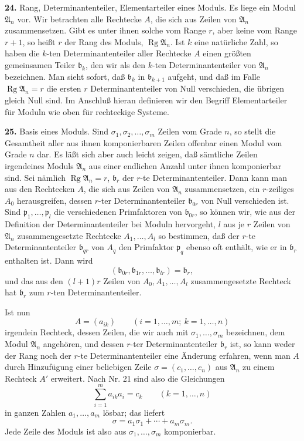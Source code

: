 \documentclass[11pt,a4paper]{article}
\begin{document}
\textbf{24.} Rang, Determinantenteiler, Elementarteiler eines Moduls. Es liege ein Modul \(\mathfrak A_n\) vor. Wir betrachten alle Rechtecke \(A\), die sich aus Zeilen von \(\mathfrak A_n\) zusammensetzen. Gibt es unter ihnen solche vom Range \(r\), aber keine vom Range \(r+1\), so heißt \(r\) der Rang des Moduls, \(\operatorname{Rg}\mathfrak A_n\). Ist \(k\) eine natürliche Zahl, so haben die \(k\)-ten Determinantenteiler aller Rechtecke \(A\) einen größten gemeinsamen Teiler \(\mathfrak b_k\), den wir als den \(k\)-ten Determinantenteiler von \(\mathfrak A_n\) bezeichnen. Man sieht sofort, daß \(\mathfrak b_k\) in \(\mathfrak b_{k+1}\) aufgeht, und daß im Falle \(\operatorname{Rg}\mathfrak A_n=r\) die ersten \(r\) Determinantenteiler von Null verschieden, die übrigen gleich Null sind. Im Anschluß hieran definieren wir den Begriff Elementarteiler für Moduln wie oben für rechteckige Systeme.

\textbf{25.} Basis eines Moduls. Sind \(\sigma_1,\sigma_2,\ldots,\sigma_m\) Zeilen vom Grade \(n\), so stellt die Gesamtheit aller aus ihnen komponierbaren Zeilen offenbar einen Modul vom Grade \(n\) dar. Es läßt sich aber auch leicht zeigen, daß sämtliche Zeilen irgendeines Moduls \(\mathfrak A_n\) aus einer endlichen Anzahl unter ihnen komponierbar sind. Sei nämlich \(\operatorname{Rg}\mathfrak A_n=r\), \(\mathfrak b_r\) der \(r\)-te Determinantenteiler. Dann kann man aus den Rechtecken \(A\), die sich aus Zeilen von \(\mathfrak A_n\) zusammensetzen, ein \(r\)-zeiliges \(A_0\) herausgreifen, dessen \(r\)-ter Determinantenteiler \(\mathfrak b_{0r}\) von Null verschieden ist. Sind \(\mathfrak p_1,\ldots,\mathfrak p_l\) die verschiedenen Primfaktoren von \(\mathfrak b_{0r}\), so können wir, wie aus der Definition der Determinantenteiler bei Moduln hervorgeht, \(l\) aus je \(r\) Zeilen von \(\mathfrak A_n\) zusammengesetzte Rechtecke \(A_1,\ldots,A_l\) so bestimmen, daß der \(r\)-te Determinantenteiler \(\mathfrak b_{qr}\) von \(A_q\) den Primfaktor \(\mathfrak p_q\) ebenso oft enthält, wie er in \(\mathfrak b_r\) enthalten ist. Dann wird
\[
 (\mathfrak b_{0r},\mathfrak b_{1r},\ldots,\mathfrak b_{lr})=\mathfrak b_r,
\]
und das aus den \((l+1)r\) Zeilen von \(A_0,A_1,\ldots,A_l\) zusammengesetzte Rechteck hat \(\mathfrak b_r\) zum \(r\)-ten Determinantenteiler.

Ist nun
\[
 A=(a_{ik})\qquad(i=1,\ldots,m;\ k=1,\ldots,n)
\]
irgendein Rechteck, dessen Zeilen, die wir auch mit \(\sigma_1,\ldots,\sigma_m\) bezeichnen, dem Modul \(\mathfrak A_n\) angehören, und dessen \(r\)-ter Determinantenteiler \(\mathfrak b_r\) ist, so kann weder der Rang noch der \(r\)-te Determinantenteiler eine Änderung erfahren, wenn man \(A\) durch Hinzufügung einer beliebigen Zeile \(\sigma=(c_1,\ldots,c_n)\) aus \(\mathfrak A_n\) zu einem Rechteck \(A'\) erweitert. Nach Nr. 21 sind also die Gleichungen
\[
 \sum_{i=1}^{m}a_{ik}a_i=c_k\qquad(k=1,\ldots,n)
\]
in ganzen Zahlen \(a_1,\ldots,a_m\) lösbar; das liefert
\[
 \sigma=a_1\sigma_1+\cdots+a_m\sigma_m.
\]
Jede Zeile des Moduls ist also aus \(\sigma_1,\ldots,\sigma_m\) komponierbar.
\end{document}
